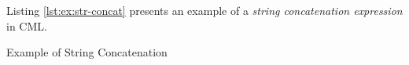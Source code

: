 Listing \ref{lst:ex:str-concat} presents an example of
a \emph{string concatenation expression} in CML.

\begin{code}[H]
\verbatimfont{\small}

\caption{Example of String Concatenation}
\label{lst:ex:str-concat}
\end{code}

